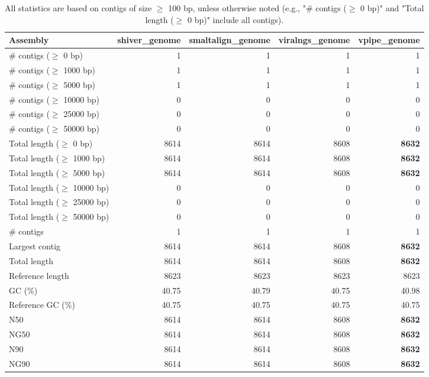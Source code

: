 \documentclass[12pt,a4paper]{article}
\begin{document}
\begin{table}[ht]
\begin{center}
\caption{All statistics are based on contigs of size $\geq$ 100 bp, unless otherwise noted (e.g., "\# contigs ($\geq$ 0 bp)" and "Total length ($\geq$ 0 bp)" include all contigs).}
\begin{tabular}{|l*{4}{|r}|}
\hline
Assembly & shiver\_genome & smaltalign\_genome & viralngs\_genome & vpipe\_genome \\ \hline
\# contigs ($\geq$ 0 bp) & 1 & 1 & 1 & 1 \\ \hline
\# contigs ($\geq$ 1000 bp) & 1 & 1 & 1 & 1 \\ \hline
\# contigs ($\geq$ 5000 bp) & 1 & 1 & 1 & 1 \\ \hline
\# contigs ($\geq$ 10000 bp) & 0 & 0 & 0 & 0 \\ \hline
\# contigs ($\geq$ 25000 bp) & 0 & 0 & 0 & 0 \\ \hline
\# contigs ($\geq$ 50000 bp) & 0 & 0 & 0 & 0 \\ \hline
Total length ($\geq$ 0 bp) & 8614 & 8614 & 8608 & {\bf 8632} \\ \hline
Total length ($\geq$ 1000 bp) & 8614 & 8614 & 8608 & {\bf 8632} \\ \hline
Total length ($\geq$ 5000 bp) & 8614 & 8614 & 8608 & {\bf 8632} \\ \hline
Total length ($\geq$ 10000 bp) & 0 & 0 & 0 & 0 \\ \hline
Total length ($\geq$ 25000 bp) & 0 & 0 & 0 & 0 \\ \hline
Total length ($\geq$ 50000 bp) & 0 & 0 & 0 & 0 \\ \hline
\# contigs & 1 & 1 & 1 & 1 \\ \hline
Largest contig & 8614 & 8614 & 8608 & {\bf 8632} \\ \hline
Total length & 8614 & 8614 & 8608 & {\bf 8632} \\ \hline
Reference length & 8623 & 8623 & 8623 & 8623 \\ \hline
GC (\%) & 40.75 & 40.79 & 40.75 & 40.98 \\ \hline
Reference GC (\%) & 40.75 & 40.75 & 40.75 & 40.75 \\ \hline
N50 & 8614 & 8614 & 8608 & {\bf 8632} \\ \hline
NG50 & 8614 & 8614 & 8608 & {\bf 8632} \\ \hline
N90 & 8614 & 8614 & 8608 & {\bf 8632} \\ \hline
NG90 & 8614 & 8614 & 8608 & {\bf 8632} \\ \hline

\end{tabular}
\end{center}
\end{table}
\end{document}
